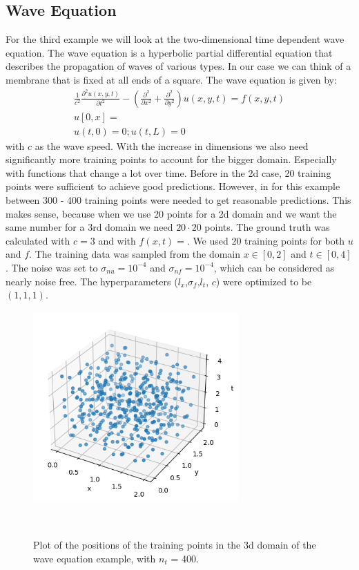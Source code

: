 \documentclass{article}
\begin{document}
\subsection{Wave Equation}
For the third example we will look at the two-dimensional time dependent wave equation. The wave equation is a hyperbolic partial differential equation that describes the propagation of waves of various types. In our case we can think of a membrane that is fixed at all ends of a square. The wave equation is given by:
\begin{equation}
    \begin{aligned}
        \frac{1}{c^2} \frac{\partial^2 u(x,y,t)}{\partial t^2} - (\frac{\partial^2}{\partial x^2} +\frac{\partial^2}{\partial y^2})u(x,y,t) = f(x,y,t) \\ u[0,x] =\\ u(t,0) = 0; u(t,L) = 0
    \end{aligned}
\end{equation}
with $c$ as the wave speed. With the increase in dimensions we also need significantly more training points to account for the bigger domain. Especially with functions that change a lot over time. Before in the 2d case, 20 training points were sufficient to achieve good predictions. However, in for this example between 300 - 400 training points were needed to get reasonable predictions. This makes sense, because when we use 20 points for a 2d domain and we want the same number for a 3rd domain we need $20\cdot 20$ points. 
The ground truth was calculated with $c = 3$ and with $f(x,t) = $.    We used 20 training points for both $u$ and $f$. The training data was sampled from the domain $x \in [0,2]$ and $t \in [0,4]$. The noise was set to $\sigma_{nu} = 10^{-4}$ and $\sigma_{nf} = 10^{-4}$, which can be considered as nearly noise free. The hyperparameters ($l_x$,$\sigma_f$,$l_t$, $c$) were optimized to be $(1,1,1)$. 

\begin{figure}
    \centering
    \includegraphics[width=0.7\textwidth]{../final_examples/wave_equation/training_points.png}
    \caption{Plot of the positions of the training points in the 3d domain of the wave equation example, with $n_t$ = 400. }
    ~\label{fig:training_points_wave}
\end{figure}
\end{document}
